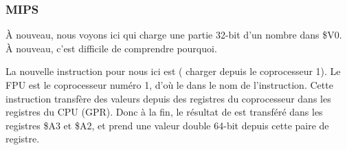 \subsubsection{MIPS}



À nouveau, nous voyons ici  qui charge une partie 32-bit d'un nombre \Tdouble
dans \$V0.
À nouveau, c'est difficile de comprendre pourquoi.


La nouvelle instruction pour nous ici est  (
charger depuis le coprocesseur 1).
Le FPU est le coprocesseur numéro 1, d'où le  dans le nom de l'instruction.
Cette instruction transfère des valeurs depuis des registres du coprocesseur dans
les registres du CPU (\ac{GPR}).
Donc à la fin, le résultat de  est transféré dans les registres \$A3 et
\$A2, et \printf prend une valeur double 64-bit depuis cette paire de registre.

